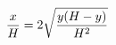 \documentclass[preview]{standalone}
\begin{document}
\begin{align*}
\special{dvisvgm:raw <g id='unique000'>}\frac{x}{H} = 2 \sqrt{\frac{y ( H - y )}{H^2}}\special{dvisvgm:raw </g>}
\end{align*}
\end{document}
